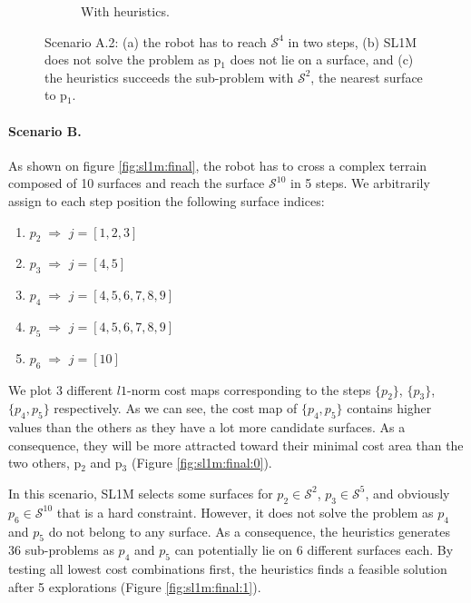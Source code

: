 \begin{figure}[ht]
\begin{subfigure}[t]{0.48\linewidth}
    \caption{With heuristics.}
    \label{fig:sl1m:a12:1}
    \end{subfigure}
    \caption{Scenario A.2: (a) the robot has to reach $\mathcal{S}^4$ in two steps, (b) SL1M does not solve the problem as p$_1$ does not lie on a surface, and (c) the heuristics succeeds the sub-problem with $\mathcal{S}^2$, the nearest surface to p$_1$.}
    \label{fig:sl1m:a12}
\end{figure}



\paragraph{Scenario B.}
As shown on figure \ref{fig:sl1m:final}, the robot has to cross a complex terrain composed of 10 surfaces and reach the surface $\mathcal{S}^{10}$ in 5 steps. 
We arbitrarily assign to each step position the following surface indices:
\begin{enumerate}
    \item $p_2 \; \Rightarrow$ \; $j = [1,2,3]$
    \item $p_3 \; \Rightarrow$ \; $j = [4,5]$
    \item $p_4 \; \Rightarrow$ \; $j = [4,5,6,7,8,9]$
    \item $p_5 \; \Rightarrow$ \; $j = [4,5,6,7,8,9]$
    \item $p_6 \; \Rightarrow$ \; $j = [10]$
\end{enumerate}
We plot 3 different $l1$-norm cost maps corresponding to the steps $\{p_2\}$, $\{p_3\}$, $\{p_4,p_5\}$ respectively.
As we can see, the cost map of $\{p_4,p_5\}$ contains higher values than the others as they have a lot more candidate surfaces. 
As a consequence, they will be more attracted toward their minimal cost area than the two others, p$_2$ and p$_3$ (Figure \ref{fig:sl1m:final:0}).

In this scenario, SL1M selects some surfaces for $p_2 \in \mathcal{S}^2$, $p_3 \in \mathcal{S}^5$, and obviously $p_6 \in \mathcal{S}^{10}$ that is a hard constraint. 
However, it does not solve the problem as $p_4$ and $p_5$ do not belong to any surface.
As a consequence, the heuristics generates 36 sub-problems as $p_4$ and $p_5$ can potentially lie on 6 different surfaces each. 
By testing all lowest cost combinations first, the heuristics finds a feasible solution after 5 explorations (Figure \ref{fig:sl1m:final:1}).

